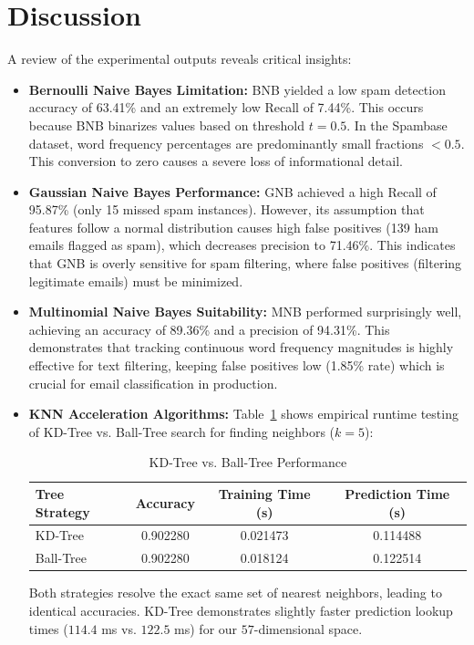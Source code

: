 \documentclass[12pt,a4paper]{article}
\begin{document}
\section{Discussion}
A review of the experimental outputs reveals critical insights:
\begin{itemize}
    \item \textbf{Bernoulli Naive Bayes Limitation:} BNB yielded a low spam detection accuracy of 63.41\% and an extremely low Recall of 7.44\%. This occurs because BNB binarizes values based on threshold $t=0.5$. In the Spambase dataset, word frequency percentages are predominantly small fractions $<0.5$. This conversion to zero causes a severe loss of informational detail.
    \item \textbf{Gaussian Naive Bayes Performance:} GNB achieved a high Recall of 95.87\% (only 15 missed spam instances). However, its assumption that features follow a normal distribution causes high false positives (139 ham emails flagged as spam), which decreases precision to 71.46\%. This indicates that GNB is overly sensitive for spam filtering, where false positives (filtering legitimate emails) must be minimized.
    \item \textbf{Multinomial Naive Bayes Suitability:} MNB performed surprisingly well, achieving an accuracy of 89.36\% and a precision of 94.31\%. This demonstrates that tracking continuous word frequency magnitudes is highly effective for text filtering, keeping false positives low (1.85\% rate) which is crucial for email classification in production.
    \item \textbf{KNN Acceleration Algorithms:} Table~\ref{tab:trees} shows empirical runtime testing of KD-Tree vs. Ball-Tree search for finding neighbors ($k=5$):
    \begin{table}[!ht]
    \centering
    \begin{tabular}{|l|c|c|c|}
    \hline
    Tree Strategy & Accuracy & Training Time (s) & Prediction Time (s) \\
    \hline
    KD-Tree & 0.902280 & 0.021473 & 0.114488 \\
    Ball-Tree & 0.902280 & 0.018124 & 0.122514 \\
    \hline
    \end{tabular}
    \caption{KD-Tree vs. Ball-Tree Performance}
    \label{tab:trees}
    \end{table}
    Both strategies resolve the exact same set of nearest neighbors, leading to identical accuracies. KD-Tree demonstrates slightly faster prediction lookup times ($114.4$ ms vs. $122.5$ ms) for our $57$-dimensional space.
\end{itemize}
\end{document}
